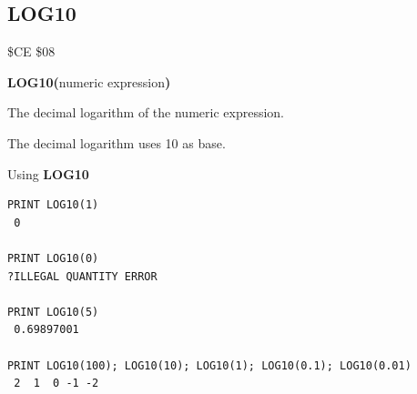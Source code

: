 \subsection{LOG10}
\begin{description}[leftmargin=2cm,style=nextline]
\item [Token:]    \$CE \$08

\item [Format:]   {\bf LOG10(}numeric expression{\bf)}

\item [Returns:]  The decimal logarithm of the numeric expression.

                  The decimal logarithm uses 10 as base.

\item [Examples:] Using {\bf LOG10}

\begin{tcolorbox}[colback=black,coltext=white]
\verbatimfont{\codefont}
\begin{verbatim}
PRINT LOG10(1)
 0

PRINT LOG10(0)
?ILLEGAL QUANTITY ERROR

PRINT LOG10(5)
 0.69897001

PRINT LOG10(100); LOG10(10); LOG10(1); LOG10(0.1); LOG10(0.01)
 2  1  0 -1 -2
\end{verbatim}
\end{tcolorbox}
\end{description}


\newpage
